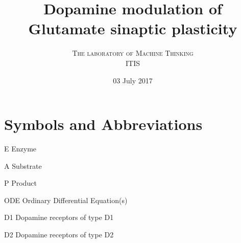 \documentclass[twoside,twocolumn]{article}
\title{Dopamine modulation of Glutamate sinaptic plasticity}
\author{
\textsc{The laboratory of Machine Thinking} \\[1ex]
\normalsize ITIS
}
\date{03 July 2017}
\begin{document}
\maketitle


\section{Symbols and Abbreviations}
\begin{strip}
\begin{abbrv}
\item[E]                   Enzyme
\item[A]                   Substrate
\item[P]                   Product
\item[ODE]                 Ordinary Differential Equation(s)
\item[D1]                  Dopamine receptors of type D1
\item[D2]                  Dopamine receptors of type D2
\end{abbrv}
\end{strip}
\end{document}
